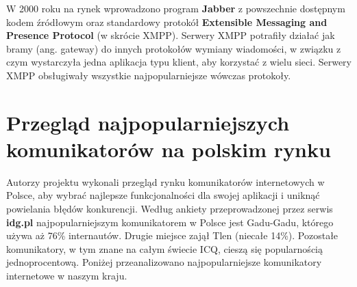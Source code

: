 \documentclass[a4paper,12pt]{article}
\begin{document}
W 2000 roku na rynek wprowadzono program \textbf{Jabber} z powszechnie dostępnym kodem źródłowym oraz standardowy protokół \textbf{Extensible Messaging and Presence Protocol} (w skrócie XMPP). Serwery XMPP potrafiły działać jak bramy (ang. gateway) do innych protokołów wymiany wiadomości, w związku z czym wystarczyła jedna aplikacja typu klient, aby korzystać z wielu sieci. Serwery XMPP obsługiwały wszystkie najpopularniejsze wówczas protokoły.


\section[Przegląd najpopularniejszych komunikatorów na polskim rynku]{Przegląd najpopularniejszych komunikatorów na polskim rynku}
Autorzy projektu wykonali przegląd rynku komunikatorów internetowych w Polsce, aby wybrać najlepsze funkcjonalności dla swojej aplikacji i uniknąć powielania błędów konkurencji.
Według ankiety przeprowadzonej przez serwis \textbf{idg.pl} \cite{ID} najpopularniejszym komunikatorem w Polsce jest Gadu-Gadu, którego używa aż 76\% internautów. Drugie miejsce zajął Tlen (niecałe 14\%). Pozostałe komunikatory, w tym znane na całym świecie ICQ, cieszą się popularnością jednoprocentową.
Poniżej przeanalizowano najpopularniejsze komunikatory internetowe w naszym kraju.
\end{document}
